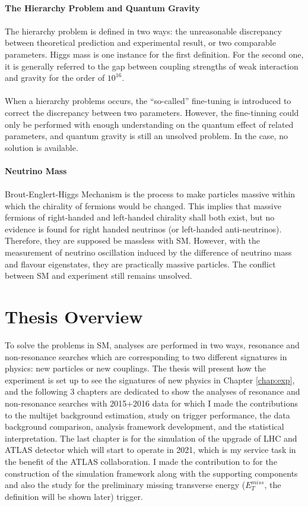 \\{\bf The Hierarchy Problem and Quantum Gravity\cite{BenA}}
\\
\\The hierarchy problem is defined in two ways: the unreasonable discrepancy between theoretical prediction and experimental result, or two comparable parameters. Higgs mass is one instance for the first definition. For the second one, it is generally referred to the gap between coupling strengths of weak interaction and gravity for the order of $10^{16}$.
\\
\\When a hierarchy problems occurs, the ``so-called'' fine-tuning is introduced to correct the discrepancy between two parameters. However, the fine-tinning could only be performed with enough understanding on the quantum effect of related parameters, and quantum gravity is still an unsolved problem. In the case, no solution is available.
\\
\\{\bf Neutrino Mass}
\\
\\Brout-Englert-Higgs Mechanism is the process to make particles massive within which the chirality of fermions would be changed. This implies that massive fermions of right-handed and left-handed chirality shall both exist, but no evidence is found for right handed neutrinos (or left-handed anti-neutrinos). Therefore, they are supposed be massless with SM. However, with the measurement of neutrino oscillation\cite{SuperK} induced by the difference of neutrino mass and flavour eigenstates, they are practically massive particles. The conflict between SM and experiment still remains unsolved.
\section{Thesis Overview}
To solve the problems in SM, analyses are performed in two ways, resonance and non-resonance searches which are corresponding to two different signatures in physics: new particles or new couplings. The thesis will present how the experiment is set up to see the signatures of new physics in Chapter \ref{chap:exp}, and the following 3 chapters are dedicated to show the analyses of resonance and non-resonance searches with 2015+2016 data for which I made the contributions to the multijet background estimation, study on trigger performance, the data background comparison, analysis framework development, and the statistical interpretation. The last chapter is for the simulation of the upgrade of LHC and ATLAS detector which will start to operate in 2021, which is my service task in the benefit of the ATLAS collaboration. I made the contribution to for the construction of the simulation framework along with the supporting components and also the study for the preliminary missing transverse energy ($E^{miss}_{T}$, the definition will be shown later) trigger.

